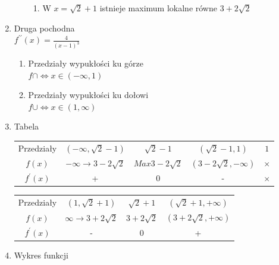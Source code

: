 \documentclass[11pt]{scrartcl}
\begin{document}
\begin{enumerate}
\begin{enumerate}
\begin{enumerate}
						\item W $ x = \sqrt{2} + 1 $ istnieje maximum lokalne równe $ 3+ 2\sqrt{2} $
					\end{enumerate}
			\end{enumerate}
		\item Druga pochodna \\
			$ f^{\prime\prime}(x) = \frac{4}{(x-1)^3} $
			\begin{enumerate}
				\item Przedziały wypukłości ku górze \\
				$ f\cap \Leftrightarrow x \in (-\infty, 1) $
				\item Przedziały wypukłości ku dołowi \\
				$ f\cup \Leftrightarrow x \in (1,\infty) $
			\end{enumerate}
		\item Tabela \\
			\begin{center}
				\begin{tabular}{ |c|c|c|c|c| } 
					\hline
					Przedziały &
						$ (-\infty, \sqrt{2} -1) $ &
						$ \sqrt{2} -1 $ & 
						$ (\sqrt{2} -1, 1) $ &
						$ 1 $ \\
					$ f(x) $ &
						$ -\infty \to 3 - 2\sqrt{2} $ &
						$ Max 3 - 2\sqrt{2} $ &
						$ (3 - 2\sqrt{2}, -\infty) $ &
						$ \times $ \\
					$ f^{\prime}(x) $ &
						+ &
						0 &
						- &
						$ \times $ \\
					\hline
				\end{tabular}
				\begin{tabular}{ |c|c|c|c| } 
				\hline
				Przedziały &
					$ (1, \sqrt{2} + 1) $ &
					$ \sqrt{2} + 1 $ &
					$ (\sqrt{2} + 1, +\infty) $\\
				$ f(x) $ &
					$ \infty \to 3 + 2\sqrt{2} $ &
					$ 3 + 2\sqrt{2} $ &
					$ (3 + 2\sqrt{2}, + \infty) $ \\
				$ f^{\prime}(x) $ &
					- &
					0 &
					+  \\
				\hline
				\end{tabular}
			\end{center}
		\item Wykres funkcji \\
			\begin{center}

\end{center}
\end{enumerate}
\end{document}
